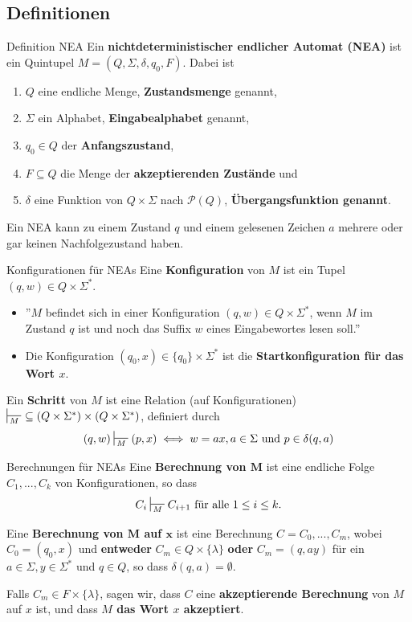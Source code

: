 \documentclass[a4paper, 11pt]{article}
\begin{document}
\subsection{Definitionen}
    \begin{mainbox}{Definition NEA}
        Ein \textbf{nichtdeterministischer endlicher Automat (NEA)} ist ein Quintupel $M = (Q, \Sigma, \delta, q_0, F)$. Dabei ist 
        \begin{enumerate}[label= (\roman*)]
            \item $Q$ eine endliche Menge, \textbf{Zustandsmenge} genannt,
            \item $\Sigma$ ein Alphabet, \textbf{Eingabealphabet} genannt,
            \item $q_0 \in Q$ der \textbf{Anfangszustand},
            \item $F \subseteq Q$ die Menge der \textbf{akzeptierenden Zustände} und 
            \item $\delta$ eine Funktion von $Q \times \Sigma$ nach $\mathcal{P}(Q)$, \textbf{Übergangsfunktion genannt}.
        \end{enumerate}
    \end{mainbox}
    Ein NEA kann zu einem Zustand $q$ und einem gelesenen Zeichen $a$ mehrere oder gar keinen Nachfolgezustand haben.

    \begin{mainbox}{Konfigurationen für NEAs}
		Eine \textbf{Konfiguration} von $M$ ist ein Tupel $(q, w) \in Q \times \Sigma^*$. 
	\end{mainbox}
	\begin{itemize}[label=-]
		\item ''$M$ befindet sich in einer Konfiguration $(q,w) \in Q \times \Sigma^*$, wenn $M$ im Zustand $q$ ist und noch das Suffix $w$ eines Eingabewortes lesen soll.''
		\item Die Konfiguration $(q_0, x) \in \{q_0\} \times \Sigma^*$ ist die \textbf{Startkonfiguration für das Wort $x$}.
	\end{itemize}
	\begin{mainbox}{}
		Ein \textbf{Schritt} von $M$ ist eine Relation (auf Konfigurationen) $\sststile{M}{} \ \subseteq (Q \times \Sigma^*)\times(Q\times \Sigma^*)$, definiert durch
		$$(q, w) \sststile{M}{}(p, x) \iff w = ax, a \in \Sigma \text{ und }p \in \delta(q, a)$$
	\end{mainbox}

	\begin{mainbox}{Berechnungen für NEAs}
		Eine \textbf{Berechnung von $\mathbf{M}$} ist eine endliche Folge $C_1, ..., C_k$ von Konfigurationen, so dass 
		$$C_i \sststile{M}{} C_{i+1} \text{ für alle } 1 \leq i \leq k.$$

		Eine \textbf{Berechnung von $\mathbf{M}$ auf $\mathbf{x}$} ist eine Berechnung $C = C_0, ..., C_m$, wobei $C_0 = (q_0, x)$ und \textbf{entweder} $C_m \in Q \times \{\lambda\}$ \textbf{oder} $C_m = (q, ay)$ für ein $a \in \Sigma, y \in \Sigma^*$ und $q \in Q$, so dass $\delta(q, a) = \emptyset$.
	\end{mainbox}
	Falls $C_m \in F \times \{\lambda\}$, sagen wir, dass $C$ eine \textbf{akzeptierende Berechnung} von $M$ auf $x$ ist, und dass \textbf{$M$ das Wort $x$ akzeptiert}.
\end{document}
